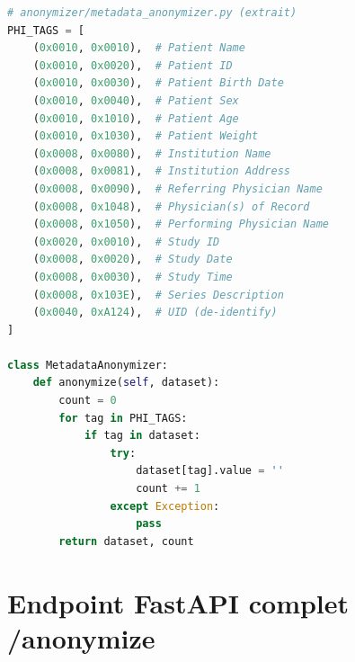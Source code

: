 \begin{lstlisting}[language=Python, caption={MetadataAnonymizer -- suppression des tags PHI DICOM}, label={lst:metadata}]
# anonymizer/metadata_anonymizer.py (extrait)
PHI_TAGS = [
    (0x0010, 0x0010),  # Patient Name
    (0x0010, 0x0020),  # Patient ID
    (0x0010, 0x0030),  # Patient Birth Date
    (0x0010, 0x0040),  # Patient Sex
    (0x0010, 0x1010),  # Patient Age
    (0x0010, 0x1030),  # Patient Weight
    (0x0008, 0x0080),  # Institution Name
    (0x0008, 0x0081),  # Institution Address
    (0x0008, 0x0090),  # Referring Physician Name
    (0x0008, 0x1048),  # Physician(s) of Record
    (0x0008, 0x1050),  # Performing Physician Name
    (0x0020, 0x0010),  # Study ID
    (0x0008, 0x0020),  # Study Date
    (0x0008, 0x0030),  # Study Time
    (0x0008, 0x103E),  # Series Description
    (0x0040, 0xA124),  # UID (de-identify)
]

class MetadataAnonymizer:
    def anonymize(self, dataset):
        count = 0
        for tag in PHI_TAGS:
            if tag in dataset:
                try:
                    dataset[tag].value = ''
                    count += 1
                except Exception:
                    pass
        return dataset, count
\end{lstlisting}

\section{Endpoint FastAPI complet /anonymize}

